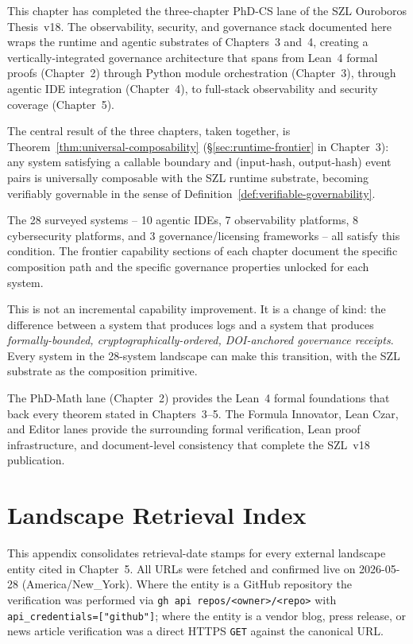 This chapter has completed the three-chapter PhD-CS lane of the SZL
Ouroboros Thesis~v18.  The observability, security, and governance stack
documented here wraps the runtime and agentic substrates of Chapters~3
and~4, creating a vertically-integrated governance architecture that spans
from Lean~4 formal proofs (Chapter~2) through Python module orchestration
(Chapter~3), through agentic IDE integration (Chapter~4), to full-stack
observability and security coverage (Chapter~5).

The central result of the three chapters, taken together, is
Theorem~\ref{thm:universal-composability} (\S\ref{sec:runtime-frontier}
in Chapter~3): any system satisfying a callable boundary and (input-hash,
output-hash) event pairs is universally composable with the SZL runtime
substrate, becoming verifiably governable in the sense of
Definition~\ref{def:verifiable-governability}.

The 28 surveyed systems -- 10 agentic IDEs, 7 observability platforms,
8 cybersecurity platforms, and 3 governance/licensing frameworks -- all
satisfy this condition.  The frontier capability sections of each chapter
document the specific composition path and the specific governance
properties unlocked for each system.

This is not an incremental capability improvement.  It is a change of
kind: the difference between a system that produces logs and a system
that produces \emph{formally-bounded, cryptographically-ordered,
DOI-anchored governance receipts}.  Every system in the 28-system
landscape can make this transition, with the SZL substrate as the
composition primitive.

The PhD-Math lane (Chapter~2) provides the Lean~4 formal foundations
that back every theorem stated in Chapters~3--5.  The Formula Innovator,
Lean Czar, and Editor lanes provide the surrounding formal verification,
Lean proof infrastructure, and document-level consistency that complete
the SZL~v18 publication.

\section{Landscape Retrieval Index}
\label{sec:landscape-retrieval-index-ch05}

This appendix consolidates retrieval-date stamps for every external
landscape entity cited in Chapter~5.  All URLs were fetched and confirmed
live on 2026-05-28 (America/New\_York).  Where the entity is a GitHub
repository the verification was performed via
\texttt{gh api repos/<owner>/<repo>} with
\texttt{api\_credentials=["github"]}; where the entity is a vendor blog,
press release, or news article verification was a direct HTTPS \texttt{GET}
against the canonical URL.

